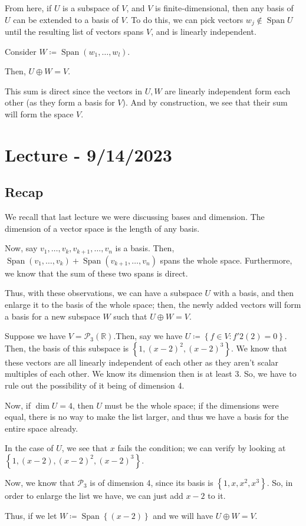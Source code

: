 \documentclass[openany]{book}
\newcommand{\RR}{\mathbb{R}}
\DeclareMathOperator*{\Span}{Span}
\begin{document}
	From here, if $U$ is a subspace of $V$, and $V$ is finite-dimensional, then any basis of $U$ can be extended to a basis of $V$. To do this, we can pick vectors $w_{j} \not\in \Span U$ until the resulting list of vectors spans $V$, and is linearly independent.
	
	\begin{thm}
		Consider $W \coloneq \Span (w_{1}, \ldots, w_{l})$.
		
		Then, $U \oplus W = V$.
		
		This sum is direct since the vectors in $U, W$ are linearly independent form each other (as they form a basis for $V$). And by construction, we see that their sum will form the space $V$.
	\end{thm}

\section{Lecture - 9/14/2023}
\subsection{Recap}
We recall that last lecture we were discussing bases and dimension. The dimension of a vector space is the length of any basis.

Now, say $v_{1}, \ldots, v_{k}, v_{k+1}, \ldots, v_{n}$ is a basis. Then, $\Span(v_{1}, \ldots, v_{k}) + \Span(v_{k+1}, \ldots, v_{n})$ spans the whole space. Furthermore, we know that the sum of these two spans is direct.

Thus, with these observations, we can have a subspace $U$ with a basis, and then enlarge it to the basis of the whole space; then, the newly added vectors will form a basis for a new subspace $W$ such that $U \oplus W = V$.

\begin{example}
	Suppose we have $V = \mathscr{P}_{3}(\RR)$.Then, say we have $U \coloneq \left\{  f \in V : f'2 (2) = 0\right\}$. Then, the basis of this subspace is $\left\{  1, (x-2)^{2}, (x-2)^{3}\right\}$. We know that these vectors are all linearly independent of each other as they aren't scalar multiples of each other. We know its dimension then is at least 3. So, we have to rule out the possibility of it being of dimension 4.
	
	Now, if $\dim U = 4$, then $U$ must be the whole space; if the dimensions were equal, there is no way to make the list larger, and thus we have a basis for the entire space already. 
	
	In the case of $U$, we see that $x$ fails the condition; we can verify by looking at $\left\{  1, (x-2), (x-2)^{2}, (x-2)^{3} \right\}$.
	
	Now, we know that $\mathscr{P}_{3}$ is of dimension 4, since its basis is $\left\{  1, x, x^{2}, x^{3}\right\}$. So, in order to enlarge the list we have, we can just add $x-2$ to it.
	
	Thus, if we let $W \coloneq \Span \left\{  (x-2)\right\}$ and we will have $U \oplus W = V$.
\end{example}
\end{document}
